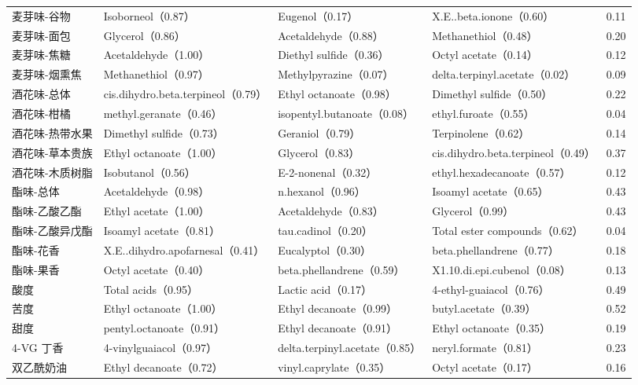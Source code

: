\begin{table}[H]
\begin{fittable}
\begin{tabular}{@{}llllr@{}}
麦芽味-谷物 & Isoborneol（0.87） & Eugenol（0.17） & X.E..beta.ionone（0.60） & 0.11 \\
麦芽味-面包 & Glycerol（0.86） & Acetaldehyde（0.88） & Methanethiol（0.48） & 0.20 \\
麦芽味-焦糖 & Acetaldehyde（1.00） & Diethyl sulfide（0.36） & Octyl acetate（0.14） & 0.12 \\
麦芽味-烟熏焦 & Methanethiol（0.97） & Methylpyrazine（0.07） & delta.terpinyl.acetate（0.02） & 0.09 \\
酒花味-总体 & cis.dihydro.beta.terpineol（0.79） & Ethyl octanoate（0.98） & Dimethyl sulfide（0.50） & 0.22 \\
酒花味-柑橘 & methyl.geranate（0.46） & isopentyl.butanoate（0.08） & ethyl.furoate（0.55） & 0.04 \\
酒花味-热带水果 & Dimethyl sulfide（0.73） & Geraniol（0.79） & Terpinolene（0.62） & 0.14 \\
酒花味-草本贵族 & Ethyl octanoate（1.00） & Glycerol（0.83） & cis.dihydro.beta.terpineol（0.49） & 0.37 \\
酒花味-木质树脂 & Isobutanol（0.56） & E-2-nonenal（0.32） & ethyl.hexadecanoate（0.57） & 0.12 \\
酯味-总体 & Acetaldehyde（0.98） & n.hexanol（0.96） & Isoamyl acetate（0.65） & 0.43 \\
酯味-乙酸乙酯 & Ethyl acetate（1.00） & Acetaldehyde（0.83） & Glycerol（0.99） & 0.43 \\
酯味-乙酸异戊酯 & Isoamyl acetate（0.81） & tau.cadinol（0.20） & Total ester compounds（0.62） & 0.04 \\
酯味-花香 & X.E..dihydro.apofarnesal（0.41） & Eucalyptol（0.30） & beta.phellandrene（0.77） & 0.18 \\
酯味-果香 & Octyl acetate（0.40） & beta.phellandrene（0.59） & X1.10.di.epi.cubenol（0.08） & 0.13 \\
酸度 & Total acids（0.95） & Lactic acid（0.17） & 4-ethyl-guaiacol（0.76） & 0.49 \\
苦度 & Ethyl octanoate（1.00） & Ethyl decanoate（0.99） & butyl.acetate（0.39） & 0.52 \\
甜度 & pentyl.octanoate（0.91） & Ethyl decanoate（0.91） & Ethyl octanoate（0.35） & 0.19 \\
4-VG 丁香 & 4-vinylguaiacol（0.97） & delta.terpinyl.acetate（0.85） & neryl.formate（0.81） & 0.23 \\
双乙酰奶油 & Ethyl decanoate（0.72） & vinyl.caprylate（0.35） & Octyl acetate（0.17） & 0.16 \\

\end{tabular}
\end{fittable}
\end{table}
